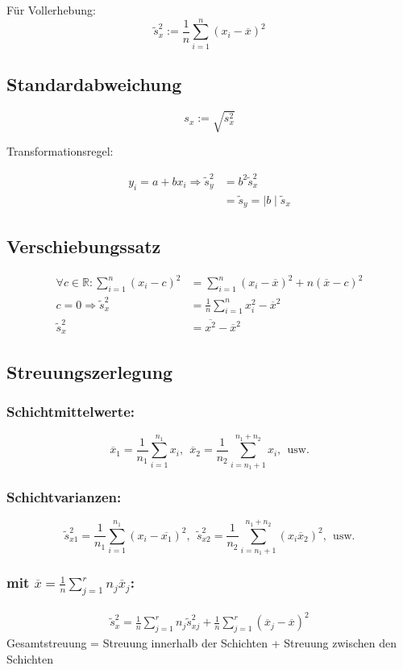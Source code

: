 \documentclass[10pt,a4paper,landscape]{article}
\begin{document}
\begin{multicols}{4}
Für Vollerhebung:
\[
\tilde{s}_x^2 := \frac{1}{n}\sum_{i=1}^n(x_i-\overline{x})^2
\]

\subsection{Standardabweichung}
\[
s_x := \sqrt{s_x^2}
\]

Transformationsregel:

\begin{align*}
y_i = a +bx_i \Rightarrow \tilde{s}_y^2 &= b^2\tilde{s}_x^2 \\
&= \tilde{s}_y = \mid b \mid \tilde{s}_x
\end{align*}

\subsection{Verschiebungssatz}
\begin{align*}
\forall c \in \mathbb{R}:
\sum_{i=1}^n(x_i-c)^2&=\sum_{i=1}^n(x_i - \overline{x})^2+n(\overline{x}-c)^2 \\
c = 0 \Rightarrow \tilde{s}_x^2 &= \frac{1}{n}\sum_{i=1}^nx_i^2-\overline{x}^2 \\	
\tilde{s}_x^2 &= \overline{x^2}-\overline{x}^2
\end{align*}

\subsection{Streuungszerlegung}
\subsubsection*{Schichtmittelwerte:}
\[
\overline{x}_1=\frac{1}{n_1}\sum_{i=1}^{n_1} x_i, ~~ \overline{x}_2=\frac{1}{n_2}\sum_{i=n_1+1}^{n_1+n_2}x_i, ~~\text{usw.}
\]


\subsubsection*{Schichtvarianzen:}
\[
\tilde{s}_{x1}^2= \frac{1}{n_1}\sum_{i=1}^{n_1}(x_i-\overline{x_1})^2, ~~ \tilde{s}_{x2}^2=\frac{1}{n_2}\sum_{i=n_1+1}^{n_1+n_2}(x_i\overline{x}_2)^2, ~~ \text{usw.}
\]

\subsubsection*{mit $\overline{x}=\frac{1}{n}\sum_{j=1}^rn_j\overline{x}_j$:}
\begin{align*}
\tilde{s}_x^2 = \frac{1}{n}\sum_{j=1}^rn_j\tilde{s}_{xj}^2 + \frac{1}{n}\sum_{j=1}^r(\overline{x}_j-\overline{x})^2 
\end{align*}
Gesamtstreuung = Streuung innerhalb der Schichten + Streuung zwischen den Schichten


\end{multicols}
\end{document}
